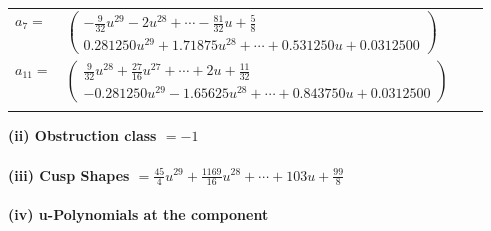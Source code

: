\documentclass[1p]{elsarticle_modified}
\theoremstyle{definition}
\begin{document}
\begin{tabular}{m{7pt} m{180pt} m{7pt} m{180pt} }
\flushright $a_{7}=$&$\begin{pmatrix}-\frac{9}{32} u^{29}-2 u^{28}+\cdots-\frac{81}{32} u+\frac{5}{8}\\0.281250 u^{29}+1.71875 u^{28}+\cdots+0.531250 u+0.0312500\end{pmatrix}$ \\
\flushright $a_{11}=$&$\begin{pmatrix}\frac{9}{32} u^{28}+\frac{27}{16} u^{27}+\cdots+2 u+\frac{11}{32}\\-0.281250 u^{29}-1.65625 u^{28}+\cdots+0.843750 u+0.0312500\end{pmatrix}$\\&\end{tabular}
\flushleft \textbf{(ii) Obstruction class $= -1$}\\~\\
\flushleft \textbf{(iii) Cusp Shapes $= \frac{45}{4} u^{29}+\frac{1169}{16} u^{28}+\cdots+103 u+\frac{99}{8}$}\\~\\
\newpage\renewcommand{\arraystretch}{1}
\flushleft \textbf{(iv) u-Polynomials at the component}\newline \\
\end{document}
